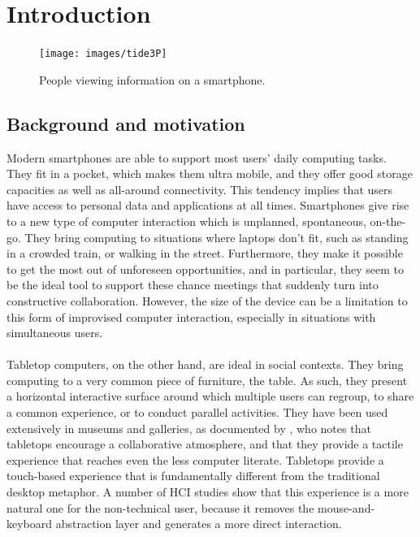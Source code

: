 

%

\chapter{Introduction}
\label{introduction}

\begin{figure}[b!]
  \centering
    \texttt{[image: images/tide3P]}
  \caption{People viewing information on a smartphone.}
  \label{tide}
\end{figure}

\section{Background and motivation}

Modern smartphones are able to support most users' daily computing tasks.
They fit in a pocket, which makes them ultra mobile, and they offer good storage capacities as well as all-around connectivity.
This tendency implies that users have access to personal data and applications at all times.
Smartphones give rise to a new type of computer interaction which is unplanned, spontaneous, on-the-go.
They bring computing to situations where laptops don't fit, such as standing in a crowded train, or walking in the street.
Furthermore, they make it possible to get the most out of unforeseen opportunities, and in particular, they seem to be the ideal tool to support these chance meetings that suddenly turn into constructive collaboration.
However, the size of the device can be a limitation to this form of improvised computer interaction, especially in situations with simultaneous users. 
\\\\
Tabletop computers, on the other hand, are ideal in social contexts.
They bring computing to a very common piece of furniture, the table.
As such, they present a horizontal interactive surface around which multiple users can regroup, to share a common experience, or to conduct parallel activities.
They have been used extensively in museums and galleries, as documented by \cite{Geller:2006:exhibits}, who notes that tabletops encourage a collaborative atmosphere, and that they provide a tactile experience that reaches even the less computer literate.
Tabletops provide a touch-based experience that is fundamentally different from the traditional desktop metaphor.
A number of HCI studies show that this experience is a more natural one for the non-technical user, because it removes the mouse-and-keyboard abstraction layer and generates a more direct interaction.

